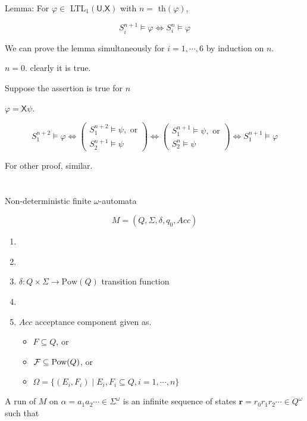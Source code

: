\documentclass[12pt]{article}
\begin{document}
\begin{CJK*}{GBK}{song}
Lemma: For $\varphi\in $ LTL$_1(\textsf{U,X})$ with $n=$ th$(\varphi)$,

$$S^{n+1}_i\models \varphi \Longleftrightarrow S_i^n\models\varphi$$


We can prove the lemma simultaneously for $i=1,\cdots,6$ by induction on $n$. 

$n=0$. clearly it is true.

Suppose the assertion is true for $n$

$\varphi=\textsf{X}\psi$. 

$$S_1^{n+2}\models \varphi\Longleftrightarrow \left( 
\begin{array}{l}
S_1^{n+2}\models \psi, \mbox{ or}\\
S_2^{n+1}\models \psi
\end{array}
\right)\Longleftrightarrow \left(\begin{array}{l}
S_1^{n+1}\models \psi, \mbox{ or}\\
S_2^{n}\models \psi
\end{array}
\right)\Longleftrightarrow S_1^{n+1}\models \varphi$$ 

For other proof, similar.\\



\ \\ \ \\

Non-deterministic finite $\omega$-automata

$$M=(Q,\Sigma,\delta,q_0, Acc)$$


\begin{enumerate}
\item \ 
\item \ 
\item $\delta:Q\times\Sigma\rightarrow\mbox{Pow}(Q)$ transition function
\item \ 
\item $Acc$ acceptance component given as.
\begin{itemize}
\item $F\subseteq Q$, or
\item ${\cal F}\subseteq\mbox{Pow}(Q)$, or 
\item $\Omega=\{(E_i,F_i)\mid E_i, F_i\subseteq Q, i=1,\cdots,n\}$ 
\end{itemize}
\end{enumerate}

A run of $M$ on $\alpha=a_1a_2\cdots\in\Sigma^{\omega}$ is an infinite sequence of states $\mathbf{r}=r_0r_1r_2\cdots\in Q^{\omega}$ such that


\end{CJK*}
\end{document}
